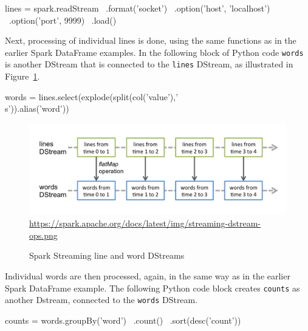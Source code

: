 \begin{samepage}
\begin{pythoncode}
lines = spark.readStream \
             .format('socket') \
             .option('host', 'localhost') \
             .option('port', 9999) \
             .load()
\end{pythoncode}
\end{samepage}

Next, processing of individual lines is done, using the same functions as in the earlier Spark DataFrame examples. In the following block of Python code \texttt{words} is another DStream that is connected to the \texttt{lines} DStream, as illustrated in Figure~\ref{fig:sparkwordcount}.

\begin{samepage}
\begin{pythoncode}
words = lines.select(explode(split(col('value'),'\\s')).alias('word'))
\end{pythoncode}
\end{samepage}

\begin{figure}
\centering

\includegraphics[width=\textwidth]{streaming-dstream-ops.png}
\scriptsize\url{https://spark.apache.org/docs/latest/img/streaming-dstream-ops.png}\normalsize
\caption{Spark Streaming line and word DStreams}
\label{fig:sparkwordcount}
\end{figure}

Individual words are then processed, again, in the same way as in the earlier Spark DataFrame example. The following Python code block creates \texttt{counts} as another Dstream, connected to the \texttt{words} DStream.

\begin{samepage}
\begin{pythoncode}
counts = words.groupBy('word') \
              .count() \
              .sort(desc('count'))
\end{pythoncode}
\end{samepage}

